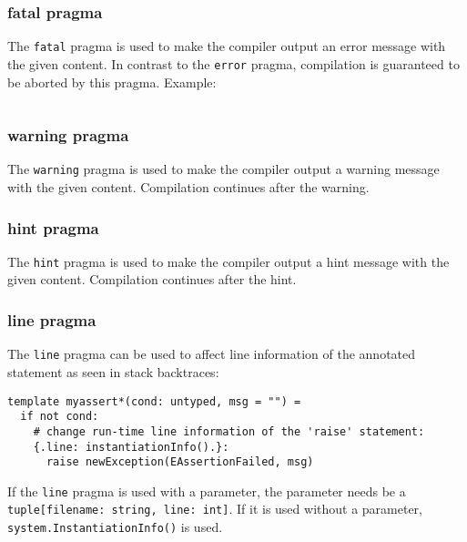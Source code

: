 \hypertarget{fatal-pragma}{%
\subsubsection{fatal pragma}\label{fatal-pragma}}

The \texttt{fatal} pragma is used to make the compiler output an error
message with the given content. In contrast to the \texttt{error}
pragma, compilation is guaranteed to be aborted by this pragma. Example:

\begin{verbatim}
\end{verbatim}

\hypertarget{warning-pragma}{%
\subsubsection{warning pragma}\label{warning-pragma}}

The \texttt{warning} pragma is used to make the compiler output a
warning message with the given content. Compilation continues after the
warning.

\hypertarget{hint-pragma}{%
\subsubsection{hint pragma}\label{hint-pragma}}

The \texttt{hint} pragma is used to make the compiler output a hint
message with the given content. Compilation continues after the hint.

\hypertarget{line-pragma}{%
\subsubsection{line pragma}\label{line-pragma}}

The \texttt{line} pragma can be used to affect line information of the
annotated statement as seen in stack backtraces:

\begin{verbatim}
template myassert*(cond: untyped, msg = "") =
  if not cond:
    # change run-time line information of the 'raise' statement:
    {.line: instantiationInfo().}:
      raise newException(EAssertionFailed, msg)
\end{verbatim}

If the \texttt{line} pragma is used with a parameter, the parameter
needs be a \texttt{tuple{[}filename:\ string,\ line:\ int{]}}. If it is
used without a parameter, \texttt{system.InstantiationInfo()} is used.

